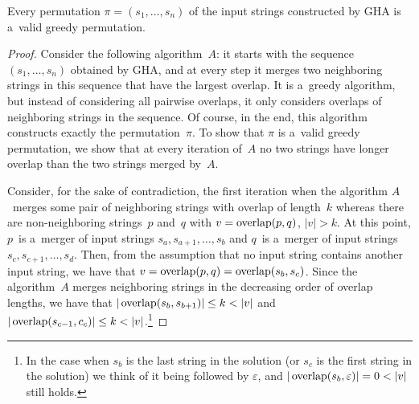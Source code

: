 \begin{theorem}
\label{thm:gr_im_wghc}
Every permutation $\pi=(s_1, \dots, s_n)$ of the input strings constructed by GHA is a~valid greedy permutation.
\end{theorem}
\begin{proof}
Consider the following algorithm~$A$: it starts with the sequence $(s_1, \dots, s_n)$ obtained by GHA, and at every step it merges two neighboring strings in this sequence that have the largest overlap. It is a~greedy algorithm, but instead of considering all pairwise overlaps, it only considers overlaps of neighboring strings in the sequence. Of course, in the end, this algorithm constructs exactly the permutation~$\pi$. To show that $\pi$ is a~valid greedy permutation, we show that at every iteration of~$A$ no two strings have longer overlap than the two strings merged by~$A$.

Consider, for the sake of contradiction, the first iteration when the algorithm $A$~merges some pair of neighboring strings with overlap of length~$k$ whereas there are non-neighboring strings~$p$ and~$q$ with $v=\operatorname{overlap}(p,q)$, $|v|>k$. 
At this point, $p$~is a~merger of input strings $s_a, s_{a+1}, \dotsc, s_b$
and $q$~is a~merger of input strings $s_c, s_{c+1}, \dotsc, s_d$. 
Then, from the assumption that no input string contains another input string, we have that $v=\operatorname{overlap}(p,q)=\operatorname{overlap}(s_b,s_c)$. Since the algorithm~$A$
merges neighboring strings in the decreasing order of overlap lengths, we have that $|\overlap(s_b,s_{b+1})| \le k <|v|$ and $|\operatorname{overlap}(s_{c-1},c_c)| \le k < |v|$.\footnote{In the case when $s_b$ is the last string in the solution (or $s_c$ is the first string in the solution) we think of it being followed by $\varepsilon$, and $|\overlap(s_b,\varepsilon)|=0<|v|$ still holds.} 


\end{proof}

